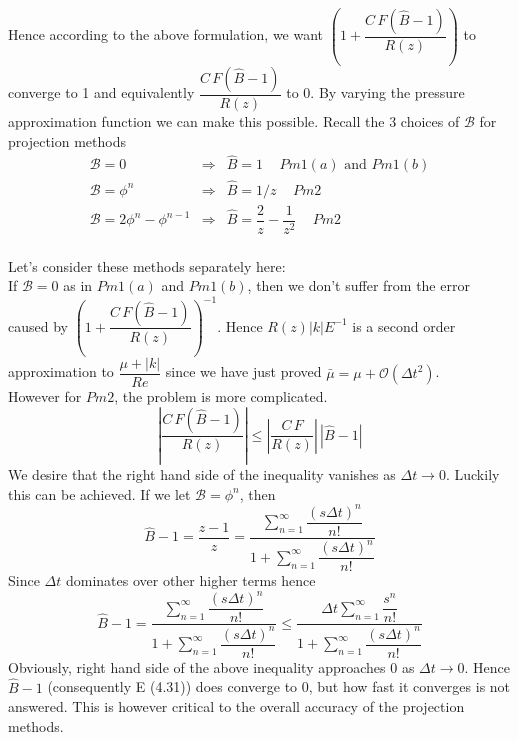 Hence according to the above formulation, we want $(1 + \dfrac{C \, F(\hat{B} - 1)}{R(z)})$ to converge to 1 and equivalently $\dfrac{C \, F(\hat{B} - 1)}{R(z)}$ to 0. By varying the pressure approximation function we can make this possible. Recall the 3 choices of $\mathcal{B}$ for projection methods
\begin{equation}
\begin{array}{lcl}
\mathcal{B} = 0 & \Rightarrow & \hat{B} = 1 \, \, \, \text{      $Pm 1 (a)$ and $Pm 1 (b)$}\\

\mathcal{B} = \phi^n & \Rightarrow & \hat{B} = 1/z \, \, \, \text{      $Pm 2$}\\

\mathcal{B} = 2\phi^n - \phi^{n-1} & \Rightarrow & \hat{B} = \dfrac{2}{z} - \dfrac{1}{z^2} \, \, \, \text{         $Pm 2$}\\
\end{array}
\end{equation}

Let's consider these methods separately here:\\

If $\mathcal{B} = 0$ as in $Pm 1 (a)$ and $Pm 1 (b)$, then we don't suffer from the error caused by $(1 + \dfrac{C \, F(\hat{B} - 1)}{R(z)})^{-1}$. Hence $R(z) |k|E^{-1}$ is a second order approximation to $\dfrac{\mu + |k|}{Re} $ since we have just proved $\bar{\mu} = \mu + \mathcal{O} (\Delta t^2)$.\\

However for $Pm 2$, the problem is more complicated. 
\begin{equation}
|\dfrac{C \, F(\hat{B} - 1)}{R(z)}| \leq |\dfrac{C \, F}{R(z)}| \, | \hat{B} - 1|
\end{equation}
We desire that the right hand side of the inequality vanishes as $\Delta t \rightarrow 0$. Luckily this can be achieved. If we let $\mathcal{B} = \phi^n$, then
\begin{dmath*}
\hat{B} - 1 = \dfrac{z - 1}{z}
= \dfrac{\sum_{n=1}^{\infty}\dfrac{(s \Delta t)^n}{n!}}{1+\sum_{n=1}^{\infty}\dfrac{(s \Delta t)^n}{n!}}
\end{dmath*}
Since $\Delta t$ dominates over other higher terms hence
\begin{equation}
\hat{B} - 1 = \dfrac{\sum_{n=1}^{\infty}\dfrac{(s \Delta t)^n}{n!}}{1+\sum_{n=1}^{\infty}\dfrac{(s \Delta t)^n}{n!}}
\leq \dfrac{\Delta t \sum_{n=1}^{\infty}\dfrac{s^n}{n!}}{1+\sum_{n=1}^{\infty}\dfrac{(s \Delta t)^n}{n!}}
\end{equation}
Obviously, right hand side of the above inequality approaches 0 as $\Delta t \rightarrow 0$. Hence $\hat{B} - 1$ (consequently E (4.31)) does converge to 0, but how fast it converges is not answered. This is however critical to the overall accuracy of the projection methods.\\

